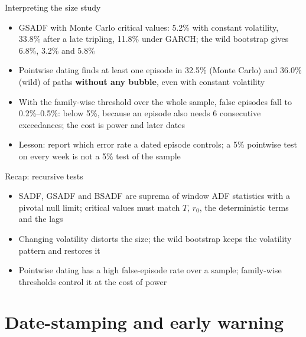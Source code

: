 \begin{frame}{Interpreting the size study}
\itemsize{\small}
\begin{itemize}
    \item GSADF with Monte Carlo critical values: 5.2\% with constant volatility, 33.8\% after a late tripling, 11.8\% under GARCH; the wild bootstrap gives 6.8\%, 3.2\% and 5.8\%
    \item Pointwise dating finds at least one episode in 32.5\% (Monte Carlo) and 36.0\% (wild) of paths \textbf{without any bubble}, even with constant volatility
    \item With the family-wise threshold over the whole sample, false episodes fall to 0.2\%--0.5\%: below 5\%, because an episode also needs 6 consecutive exceedances; the cost is power and later dates
    \item Lesson: report which error rate a dated episode controls; a 5\% pointwise test on every week is not a 5\% test of the sample
\end{itemize}
\end{frame}

\begin{frame}{Recap: recursive tests}
\itemsize{\small}
\begin{itemize}
    \item SADF, GSADF and BSADF are suprema of window ADF statistics with a pivotal null limit; critical values must match $T$, $r_0$, the deterministic terms and the lags
    \item Changing volatility distorts the size; the wild bootstrap keeps the volatility pattern and restores it
    \item Pointwise dating has a high false-episode rate over a sample; family-wise thresholds control it at the cost of power
\end{itemize}
\end{frame}


\section{Date-stamping and early warning}

